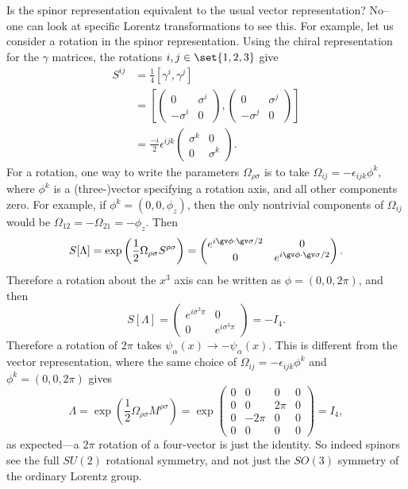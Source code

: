 Is the spinor representation equivalent to the usual vector representation? No-- one can look at specific Lorentz transformations to see this. For example, let us consider a rotation in the spinor representation. Using the chiral representation for the $\gamma$ matrices, the rotations $i,j\in\set{1,2,3}$ give
\begin{align*}
    S^{ij}&= \frac{1}{4}\left[\gamma^i,\gamma^j\right]\\
    &=\left[\begin{pmatrix}
        0&\sigma^i\\
        -\sigma^i&0
    \end{pmatrix},
    \begin{pmatrix}
        0&\sigma^j\\
        -\sigma^j&0
    \end{pmatrix}\right]\\
    &=\frac{-i}{2} \epsilon^{ijk}\begin{pmatrix}
        \sigma^k&0\\
        0&\sigma^k
    \end{pmatrix}.
\end{align*}
For a rotation, one way to write the parameters $\Omega_{\rho\sigma}$ is to take $\Omega_{ij}=-\epsilon_{ijk}\phi^k,$ where $\phi^k$ is a (three-)vector specifying a rotation axis, and all other components zero. For example, if $\phi^k=(0,0,\phi_z)$, then the only nontrivial components of $\Omega_{ij}$ would be $\Omega_{12}=-\Omega_{21} = - \phi_z$. %
Then
$$S[\Lambda]=\exp\left(\frac{1}{2}\Omega_{\rho\sigma}S^{\rho\sigma}\right)=\begin{pmatrix}
e^{i\gv\phi \cdot \gv \sigma/2}& 0\\
0&e^{i\gv\phi \cdot \gv \sigma/2}
\end{pmatrix}.$$
Therefore a rotation about the $x^3$ axis can be written as $\phi=(0,0,2\pi)$, and then 
$$S[\Lambda]=\begin{pmatrix}
e^{i \sigma^3 \pi}& 0\\
0&e^{i\sigma^3 \pi}
\end{pmatrix}=-I_4.$$
Therefore a rotation of $2\pi$ takes $\psi_\alpha(x)\to -\psi_\alpha(x).$ This is different from the vector representation, where the same choice of $\Omega_{ij}=-\epsilon_{ijk} \phi^k$ and $\phi^k=(0,0,2\pi)$ gives
\begin{equation}
    \Lambda = \exp\left(\frac{1}{2}\Omega_{\rho\sigma}M^{\rho\sigma}\right) = 
    \exp \begin{pmatrix}
        0&0&0&0\\
        0&0&2\pi&0\\
        0&-2\pi&0&0\\
        0&0&0&0
    \end{pmatrix}
    = I_4,
\end{equation}
as expected---a $2\pi$ rotation of a four-vector is just the identity. So indeed spinors see the full $SU(2)$ rotational symmetry, and not just the $SO(3)$ symmetry of the ordinary Lorentz group.

